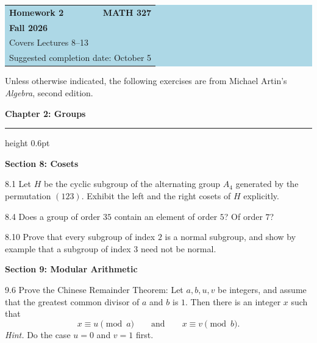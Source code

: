 \documentclass[11pt]{article}
\newcommand{\chapterheading}[1]{%
  \par\vspace{0.5em}
  {\color{courseblue}\Large\bfseries #1}\par\vspace{0.35em}
  {\color{boxborder}\hrule height 0.6pt}\vspace{0.35em}
}
\newcommand{\sectionheading}[1]{%
  \Needspace{8\baselineskip}
  \vspace{0.25em}
  {\color{darkgray}\large\bfseries #1}\par
}
\begin{document}
\begin{center}
  \colorbox{lightblue}{%
    \begin{minipage}{0.92\textwidth}
      \vspace{0.6em}
      \begin{tabular*}{\textwidth}{@{\extracolsep{\fill}}lr}
        {\color{courseblue}\bfseries\LARGE Homework 2} &
        {\color{courseblue}\bfseries\LARGE MATH 327}\\[0.4em]
        \multicolumn{2}{l}{\color{darkgray}\bfseries Fall 2026}\\[0.35em]
        \multicolumn{2}{l}{\color{darkgray}Covers Lectures 8--13}\\[0.2em]
        \multicolumn{2}{l}{\color{darkgray}Suggested completion date: October 5}
      \end{tabular*}
      \vspace{0.5em}
    \end{minipage}}
\end{center}

\vspace{0.5em}

Unless otherwise indicated, the following exercises are from Michael Artin's
\emph{Algebra}, second edition.

\chapterheading{Chapter 2: Groups}

\sectionheading{Section 8: Cosets}

\begin{exercise}{8.1}
Let $H$ be the cyclic subgroup of the alternating group $A_4$ generated
by the permutation $(123)$. Exhibit the left and the right cosets of $H$
explicitly.
\end{exercise}

\begin{exercise}{8.4}
Does a group of order $35$ contain an element of order $5$? Of order $7$?
\end{exercise}

\begin{exercise}{8.10}
Prove that every subgroup of index $2$ is a normal subgroup, and show by
example that a subgroup of index $3$ need not be normal.
\end{exercise}

\sectionheading{Section 9: Modular Arithmetic}

\begin{exercise}{9.6}
Prove the Chinese Remainder Theorem: Let $a,b,u,v$ be integers, and assume
that the greatest common divisor of $a$ and $b$ is $1$. Then there is an
integer $x$ such that
\[
  x\equiv u\pmod a
  \qquad\text{and}\qquad
  x\equiv v\pmod b.
\]
\textit{Hint.} Do the case $u=0$ and $v=1$ first.
\end{exercise}
\end{document}

